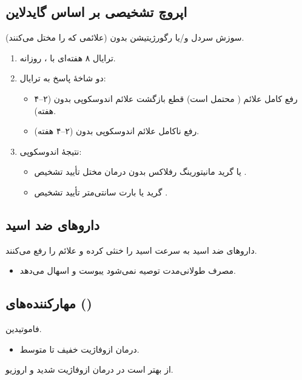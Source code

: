 \documentclass[12pt,a4paper]{article}
\begin{document}
\subsection*{اپروچ تشخیصی بر اساس گایدلاین }
سوزش سردل و/یا رگورژیتیشن بدون  (علائمی که  را مختل می‌کنند).
\begin{enumerate}
\item ترایال ۸ هفته‌ای با ، روزانه.
\item دو شاخهٔ پاسخ به ترایال:
  \begin{itemize}
  \item رفع کامل علائم ( محتمل است) \GERDArrow{} قطع  \GERDArrow{} بازگشت علائم \GERDArrow{} اندوسکوپی بدون  (۲–۴ هفته).
  \item رفع ناکامل علائم \GERDArrow{} اندوسکوپی بدون  (۲–۴ هفته).
  \end{itemize}
\item نتیجهٔ اندوسکوپی:
  \begin{itemize}
  \item {} یا  گرید  \GERDArrow{} مانیتورینگ رفلاکس بدون درمان \GERDArrow{} مختل \GERDArrow{} تأیید تشخیص .
  \item گرید  یا بارت  سانتی‌متر \GERDArrow{} تأیید تشخیص .
  \end{itemize}
\end{enumerate}

\subsection*{داروهای ضد اسید}
داروهای ضد اسید به سرعت اسید را خنثی کرده و علائم را رفع می‌کنند.
\begin{itemize}
\item مصرف طولانی‌مدت توصیه نمی‌شود \GERDArrow{}  یبوست و  اسهال می‌دهد.
\end{itemize}

\subsection*{مهارکننده‌های  ()}
فاموتیدین.
\begin{itemize}
\item درمان ازوفاژیت خفیف تا متوسط.
\end{itemize}
 از  بهتر است در درمان ازوفاژیت شدید و اروزیو.
\end{document}
